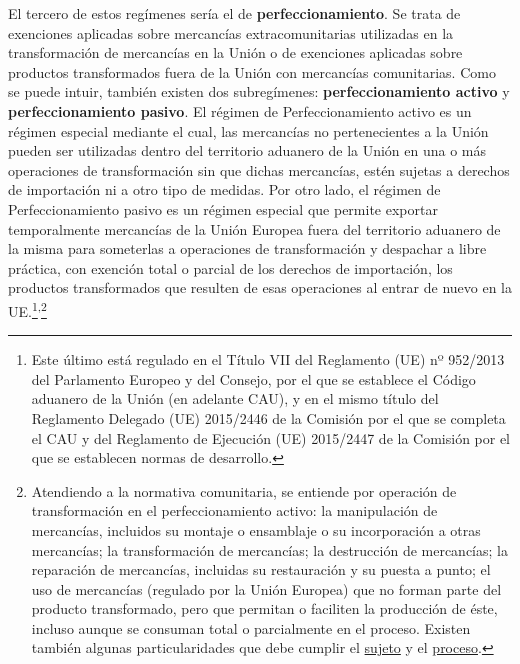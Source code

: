 \documentclass[10pt,a4paper]{article}
\begin{document}
El tercero de estos regímenes sería el de \textbf{perfeccionamiento}. Se trata de exenciones aplicadas sobre mercancías extracomunitarias utilizadas en la transformación de mercancías en la Unión o de exenciones aplicadas sobre productos transformados fuera de la Unión con mercancías comunitarias. Como se puede intuir, también existen dos subregímenes: \textbf{perfeccionamiento activo} y \textbf{perfeccionamiento pasivo}. El régimen de Perfeccionamiento activo es un régimen especial mediante el cual, las mercancías no pertenecientes a la Unión pueden ser utilizadas dentro del territorio aduanero de la Unión en una o más operaciones de transformación sin que dichas mercancías, estén sujetas a derechos de importación ni a otro tipo de medidas. Por otro lado, el régimen de Perfeccionamiento pasivo es un régimen especial que permite exportar temporalmente mercancías de la Unión Europea fuera del territorio aduanero de la misma para someterlas a operaciones de transformación y despachar a libre práctica, con exención total o parcial de los derechos de importación, los productos transformados que resulten de esas operaciones al entrar de nuevo en la UE.\footnote{%
    Este último está regulado en el Título VII del Reglamento (UE) nº 952/2013 del Parlamento Europeo y del Consejo, por el que se establece el Código aduanero de la Unión (en adelante CAU), y en el mismo título del Reglamento Delegado (UE) 2015/2446 de la Comisión por el que se completa el CAU y del Reglamento de Ejecución (UE) 2015/2447 de la Comisión por el que se establecen normas de desarrollo.
}\textsuperscript{,}\footnote{%
    Atendiendo a la normativa comunitaria, se entiende por operación de transformación en el perfeccionamiento activo: la manipulación de mercancías, incluidos su montaje o ensamblaje o su incorporación a otras mercancías; la transformación de mercancías; la destrucción de mercancías; la reparación de mercancías, incluidas su restauración y su puesta a punto; el uso de mercancías (regulado por la Unión Europea) que no forman parte del producto transformado, pero que permitan o faciliten la producción de éste, incluso aunque se consuman total o parcialmente en el proceso. Existen también algunas particularidades que debe cumplir el \href{https://sede.agenciatributaria.gob.es/Sede/aduanas/regimenes-especiales/perfeccionamiento-activo-perfeccionamiento-pasivo/requisitos-que-debe-reunir-solicitante-activo.html}{sujeto} y el \href{https://sede.agenciatributaria.gob.es/Sede/aduanas/regimenes-especiales/perfeccionamiento-activo-perfeccionamiento-pasivo/condiciones-necesarias-consecucion-autorizacion-perf-act.html}{proceso}.

}
\end{document}
